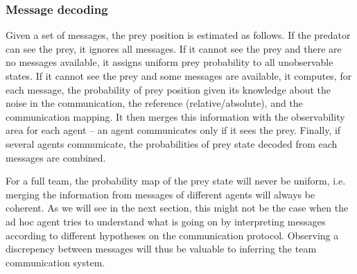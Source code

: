 \subsubsection*{Message decoding}

Given a set of messages, the prey position is estimated as follows. If the predator can see the prey, it ignores all messages. If it cannot see the prey and there are no messages available, it assigns uniform prey probability to all unobservable states.  If it cannot see the prey and some messages are available, it computes, for each message, the probability of prey position given its knowledge about the noise in the communication, the reference (relative/absolute), and the communication mapping. It then merges this information with the observability area for each agent -- an agent communicates only if it sees the prey. Finally, if several agents communicate, the probabilities of prey state decoded from each messages are combined.%

For a full team, the probability map of the prey state will never be uniform, i.e.  merging the information from messages of different agents will always be coherent. As we will see in the next section, this might not be the case when the ad hoc agent tries to understand what is going on by interpreting messages according to different hypotheses on the communication protocol. Observing a discrepency between messages will thus be valuable to inferring the team communication system.%
